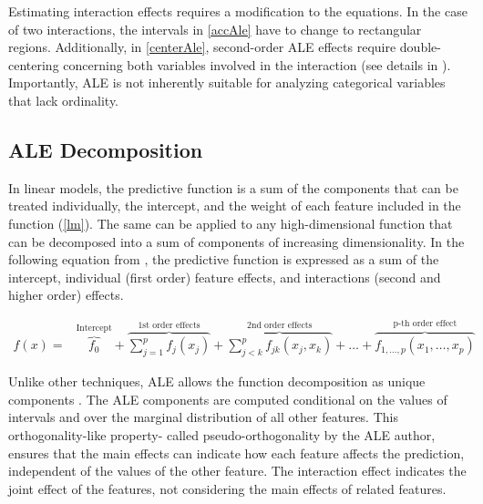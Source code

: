 Estimating interaction effects requires a modification to the equations. In the case of two interactions, the intervals in \ref{accAle} have to change to rectangular regions. Additionally, in \ref{centerAle}, second-order ALE effects require double-centering concerning both variables involved in the interaction (see details in \cite{Apley2020VisualizingModels}). Importantly, ALE is not inherently suitable for analyzing categorical variables that lack ordinality.

\subsection{ALE Decomposition}

In linear models, the predictive function is a sum of the components that can be treated individually, the intercept, and the weight of each feature included in the function (\ref{lm}). The same can be applied to any high-dimensional function that can be decomposed into a sum of components of increasing dimensionality. In the following equation from \cite{Molnar2019QuantifyingInterpretability}, the predictive function is expressed as a sum of the intercept, individual (first order) feature effects, and interactions (second and higher order) effects.

\begin{eqnarray}\label{eqn:decomp} f(x)  = &\overbrace{f_0}^\text{Intercept} + \overbrace{\sum_{j=1}^p f_j(x_j)}^\text{1st order effects} + \overbrace{\sum_{j<k}^p f_{jk}(x_j, x_k)}^\text{2nd order effects} + \ldots + \overbrace{f_{1,\ldots,p}(x_1, \ldots, x_p)}^\text{p-th order effect}
\end{eqnarray}

Unlike other techniques, ALE allows the function decomposition as unique components \cite{Apley2020VisualizingModels}. The ALE components are computed conditional on the values of intervals and over the marginal distribution of all other features. This orthogonality-like property- called pseudo-orthogonality by the ALE author, ensures that the main effects can indicate how each feature affects the prediction, independent of the values of the other feature. The interaction effect indicates the joint effect of the features, not considering the main effects of related features. 
